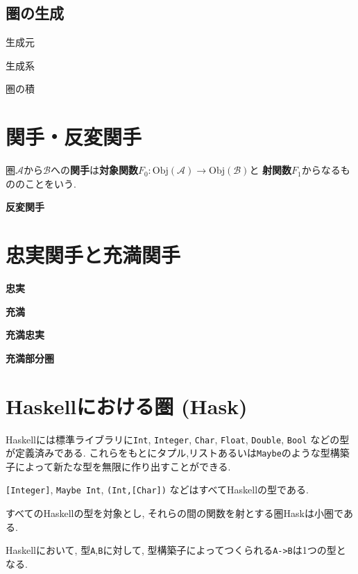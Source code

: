 \documentclass{jsbook}
\theoremstyle{plain}
\begin{document}
\subsection{圏の生成}
\begin{Def}
生成元
\end{Def}
\begin{Def}
生成系
\end{Def}
\begin{Def}
圏の積
\end{Def}
\section{関手・反変関手}
\begin{Def}
圏$\mathscr{A}$から$\mathscr{B}$への{\bf 関手}は{\bf 対象関数}$F_0:\mathrm{Obj}(\mathscr{A})\rightarrow\mathrm{Obj}(\mathscr{B})$と
{\bf 射関数}$F_1$からなるもののことをいう.
\end{Def}
\begin{Def}
{\bf 反変関手}
\end{Def}

\section{忠実関手と充満関手}
\begin{Def}
{\bf 忠実}
\end{Def}
\begin{Def}
{\bf 充満}
\end{Def}
\begin{Def}
{\bf 充満忠実}
\end{Def}
\begin{Def}
{\bf 充満部分圏}
\end{Def}
\section{Haskellにおける圏 (Hask)}
Haskellには標準ライブラリに\verb|Int|, \verb|Integer|, 
\verb|Char|,
\verb|Float|,
\verb|Double|,
\verb|Bool|
などの型が定義済みである.
これらをもとにタプル,リストあるいは\verb|Maybe|のような型構築子によって新たな型を無限に作り出すことができる.
\begin{example}
\verb|[Integer]|, \verb|Maybe Int|,
\verb|(Int,[Char])| などはすべてHaskellの型である.
\end{example}

すべてのHaskellの型を対象とし, それらの間の関数を射とする圏Haskは小圏である.
\begin{caution}
Haskellにおいて, 型\verb|A|,\verb|B|に対して, 型構築子によってつくられる\verb|A->B|は1つの型となる.
\end{caution}
\end{document}
